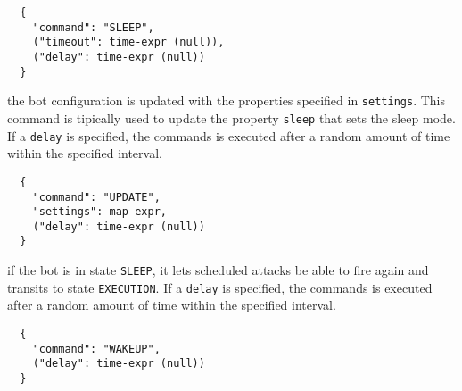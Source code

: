 \begin{description}
  \begin{verbatim}
  {
    "command": "SLEEP",
    ("timeout": time-expr (null)),
    ("delay": time-expr (null))
  }
  \end{verbatim}

  \item[UPDATE] the bot configuration is updated with the properties specified in \texttt{settings}. This command is tipically used to update the property \texttt{sleep} that sets the sleep mode.
  If a \texttt{delay} is specified, the commands is executed after a random amount of time within the specified interval.

  \begin{verbatim}
  {
    "command": "UPDATE",
    "settings": map-expr,
    ("delay": time-expr (null))
  }
  \end{verbatim}

  \item[WAKEUP] if the bot is in state \texttt{SLEEP}, it lets scheduled attacks be able to fire again and transits to state \texttt{EXECUTION}.
  If a \texttt{delay} is specified, the commands is executed after a random amount of time within the specified interval.

  \begin{verbatim}
  {
    "command": "WAKEUP",
    ("delay": time-expr (null))
  }
  \end{verbatim}

\end{description}

